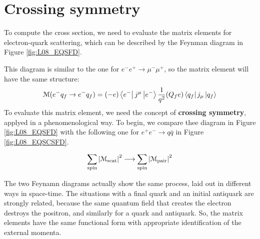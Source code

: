 \documentclass[../../main/main.tex]{subfiles}
\begin{document}

\section{Crossing symmetry}
To compute the cross section, we need to evaluate the matrix elements for electron-quark scattering, which can be described by the Feynman diagram in Figure \ref{fig:L08_EQSFD}.

This diagram is similar to the one for \( e^-e^+ \longrightarrow \mu^-\mu^+ \), so the matrix element will have the same structure:
\begin{equation}
	\mathcal{M}(e^-q_f \rightarrow e^-q_f)
	=
	(-e) \bra{e^-} j^\mu \ket{e^-} \frac{1}{q^2} (Q_f e) \bra{q_f} j_\mu \ket{q_f}
	\label{eq:L08_EQSME}
\end{equation}
To evaluate this matrix element, we need the concept of \textbf{crossing symmetry}, applyed in a phenomenological way. To begin, we compare thee diagram in Figure \ref{fig:L08_EQSFD} with the following one for \( e^+e^- \longrightarrow q\bar{q} \) in Figure \ref{fig:L08_EQSCSFD}.

\begin{equation}
	\sum_{\text{spin}} \abs{\mathcal{M}_\mathrm{scat}}^2
	\longrightarrow
	\sum_{\text{spin}} \abs{\mathcal{M}_\mathrm{pair}}^2
	\label{eq:}
\end{equation}

The two Feynamn diagrams actually show the same process, laid out in different ways in space-time. The situations with a final quark and an initial antiquark are strongly related, because the same quantum field that creates the electron destroys the positron, and similarly for a quark and antiquark. So, the matrix elements have the same functional form with appropriate identification of the external momenta.
\end{document}
